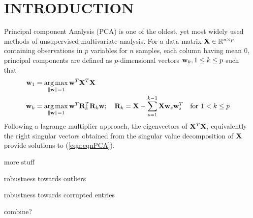 \section*{\sffamily \Large INTRODUCTION}

Principal component Analysis (PCA) is one of the oldest, yet most widely used methods of unsupervised multivariate analysis. For a data matrix ${\mathbf{X}} \in {\mathbb{R}}^{n \times p}$ containing observations in $p$ variables for $n$ samples, each column having mean 0, principal components are defined as $p$-dimensional vectors ${\bf{w}}_k, 1 \leq k \leq p$ such that
%
\begin{align}\label{eqn:eqnPCA}
{\bf{w}}_1 &= \operatorname*{arg\,max}_{\| {\bf{w}} \| = 1} {\bf{w}}^T {\mathbf{X}}^T {\mathbf{X}} \notag\\
{\bf{w}}_k &= \operatorname*{arg\,max}_{\| {\bf{w}} \| = 1} {\bf{w}}^T {\mathbf{R}}_k^T {\mathbf{R}}_k {\bf{w}}; \quad {\mathbf{R}}_k = {\mathbf{X}} - \sum_{s=1}^{k-1} {\mathbf{X}} {\bf{w}}_s {\bf{w}}_s^T \quad \text{for } 1< k \leq p
\end{align}
%
Following a lagrange multiplier approach, the eigenvectors of ${\mathbf{X}}^T {\mathbf{X}}$, equivalently the right singular vectors obtained from the singular value decomposition of ${\mathbf{X}}$ provide solutions to (\ref{eqn:eqnPCA}).

{\colrbf more stuff}

{\colrbf robustness towards outliers}

{\colrbf robustness towards corrupted entries}

{\colrbf combine?}